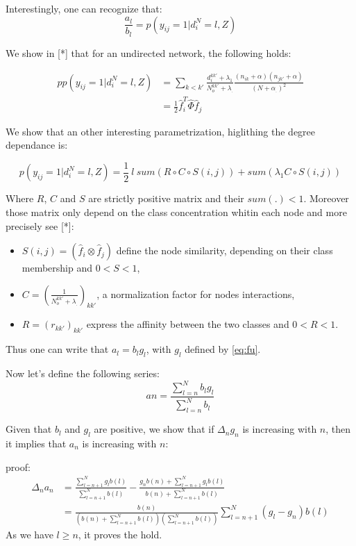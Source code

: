 \documentclass[a4paper, 12pt]{article}
\begin{document}
Interestingly, one can recognize that:
\begin{equation}
\frac{a_l}{b_l} = p(y_{ij}=1 | d_i^N=l, Z) 
\end{equation}

We show in [*] that for an undirected network, the following holds:

\begin{align}\label{eq:fu}
pp(y_{ij}=1 | d_i^N=l, Z) &=\sum_{k<k'} \frac{ d_i^{kk'} + \lambda_1}{N_o^{kk'} + \lambda_{.}} \frac{(n_{ik}+ \alpha)(n_{jk'} + \alpha)}{(N+\alpha_.)^2} \\
&=\frac{1}{2} \hat f_i^T \hat \Phi \hat f_j
\end{align}

We show that an other interesting parametrization, higlithing the degree dependance is:


\begin{equation} \label{eq:fu}
p(y_{ij}=1 | d_i^N=l, Z) = \frac{1}{2}\ l\ sum(R \circ C \circ S(i,j)) + sum(\lambda_1 C\circ S(i,j))
\end{equation}

Where $R$, $C$ and $S$ are strictly positive matrix and their $sum(.)<1$. Moreover those matrix only depend on the class concentration whitin each node and more precisely see [*]:
\begin{itemize}
\item $S(i,j) = (\hat f_i \otimes \hat f_j)$ define the node similarity, depending on their class membership and $0<S<1$, \\
\item $C = (\frac{1}{N_o^{kk'} + \lambda_{.}})_{kk'}$, a normalization factor for nodes interactions, \\
\item $R = (r_{kk'})_{kk'}$ express the affinity between the two classes and $0<R<1$.
\end{itemize}


Thus one can write that $a_l = b_l g_l$, with $g_l$ defined by \eqref{eq:fu}.

Now let's define the following series:
\begin{equation}
an = \frac{\sum_{l=n}^N b_l g_l}{\sum_{l=n}^N b_l}
\end{equation}

Given that $b_l$ and $g_l$ are positive, we show that if $\Delta_n g_n$ is increasing with $n$, then it implies that $a_n$ is increasing with $n$:

proof:
\begin{align}
\Delta_n a_n &= \frac{\sum_{l=n+1}^N g_l b(l)}{\sum_{l=n+1}^N b(l)} - \frac{g_n b(n) + \sum_{l=n+1}^N g_l b(l)}{b(n) + \sum_{l=n+1}^N b(l)} \\
&= \frac{b(n)}{\left(b(n) + \sum_{l=n+1}^N b(l)\right) \left(\sum_{l=n+1}^N b(l)\right)} \sum_{l=n+1}^N (g_l-g_n)b(l)
\end{align}
As we have $l \geq n$, it proves the hold.\\
\end{document}
